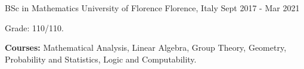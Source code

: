 \begin{cventries}
  \cventry
    {BSc in Mathematics} %
    {University of Florence} %
    {Florence, Italy} %
    {Sept 2017 - Mar 2021} %
    {
      \begin{cvitems} %
        \item {Grade: 110/110.}
        \item {\textbf{Courses:} Mathematical Analysis, Linear Algebra, Group Theory, Geometry, Probability and Statistics, Logic and Computability.}
      \end{cvitems}
    }
    
\end{cventries}
